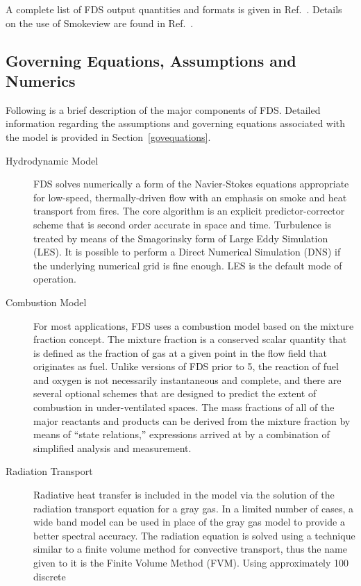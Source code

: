 \documentclass[11pt]{book}
\begin{document}
A complete list of FDS output quantities and formats is given in Ref.~\cite{FDS_Users_Guide_5}.
Details on the use of Smokeview are found in Ref.~\cite{Smokeview_Users_Guide_5}.




\subsection{Governing Equations, Assumptions and Numerics}

Following is a brief description of
the major components of FDS. Detailed information regarding the assumptions and governing equations associated
with the model is provided in Section~\ref{govequations}.
\begin{description}
\item[Hydrodynamic Model] FDS
solves numerically a form of the Navier-Stokes equations appropriate
for low-speed, thermally-driven flow with an emphasis on
smoke and heat transport from fires. The core algorithm is an
explicit predictor-corrector scheme that is second order accurate in space
and time. Turbulence is treated by means of the Smagorinsky form of
Large Eddy Simulation (LES). It is possible to perform a Direct
Numerical Simulation (DNS) if the underlying numerical grid is fine
enough. LES is the default mode of operation.
\item[Combustion Model]
For most applications, FDS uses a combustion model based on the mixture fraction concept.
The mixture fraction is a conserved scalar quantity
that is defined as the
fraction of gas at a given point in the flow field that originates as fuel.
Unlike versions of FDS prior to 5, the reaction of fuel and oxygen is not necessarily instantaneous and complete, and there are
several optional schemes that are designed to predict the extent of combustion in under-ventilated spaces.
The mass fractions of all of the major reactants and products can
be derived from the mixture fraction by means of ``state relations,''
expressions arrived at by a
combination of simplified analysis and measurement.
\item[Radiation Transport] Radiative heat transfer is included in the
model via the solution of the radiation transport equation for a gray
gas. In a limited number of cases, a wide band model can be used in
place of the gray gas model to provide a better spectral accuracy. The
radiation equation is solved using a technique similar to a finite
volume method for convective transport, thus the name given to it is
the Finite Volume Method (FVM). Using approximately 100 discrete

\end{description}
\end{document}
